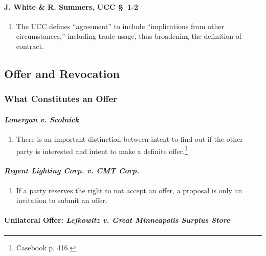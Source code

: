 \paragraph{J. White \& R. Summers, UCC \S\ 1-2}

\begin{enumerate}
    \item The UCC defines ``agreement'' to include ``implications from other 
    circumstances,'' including trade usage, thus broadening the definition of 
    contract.
\end{enumerate}

\subsection{Offer and Revocation}

\subsubsection{What Constitutes an Offer}

\paragraph{\emph{Lonergan v. Scolnick}}

\begin{enumerate}
    \item There is an important distinction between intent to find out if the 
    other party is interested and intent to make a definite 
    offer.\footnote{Casebook p. 416.}
\end{enumerate}

\paragraph{\emph{Regent Lighting Corp. v. CMT Corp.}}

\begin{enumerate}
    \item If a party reserves the right to not accept an offer, a proposal is 
    only an invitation to submit an offer.
\end{enumerate}

\paragraph{Unilateral Offer: \emph{Lefkowitz v. Great Minneapolis Surplus 
Store}}

